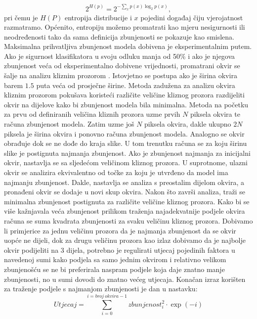 \documentclass[times, utf8, diplomski]{fer}
\theoremstyle{definition}
\begin{document}
\begin{equation}
2^{H(p)} = 2 ^ {- \sum_{x}^{}p(x)\log_{2}p(x)},
\end{equation}
pri čemu je $H(P)$ entropija distribucije i $x$ pojedini događaj čiju vjerojatnost razmatramo. Općenito, entropiju možemo promatrati kao mjeru nesigurnosti ili neodređenosti tako da sama definicija zbunjenosti se pokazuje kao smislena. Maksimalna prihvatljiva zbunjenost modela dobivena je eksperimentalnim putem. Ako je sigurnost klasifikatora u svoju odluku manja od 50\% i ako je njegova zbunjenost veća od eksperimentalno dobivene vrijednosti, promatrani okvir se šalje na analizu kliznim prozorom . Istovjetno se postupa ako je širina okvira barem $1.5$ puta veća od prosječne širine.
\newline
Metoda zadužena za analizu okvira kliznim prozorom pokušava koristeći različite veličine kliznog prozora razdijeliti okvir na dijelove kako bi zbunjenost modela bila minimalna. Metoda na početku za prvu od definiranih veličina kliznih prozora uzme prvih $N$ piksela okvira te računa zbunjenost modela. Zatim uzme još $N$ piksela okvira, dakle ukupno $2N$ piksela je širina okvira i ponovno računa zbunjenost modela. Analogno se okvir obrađuje dok se ne dođe do kraja slike. U tom trenutku računa se za koju širinu slike je postignuta najmanja zbunjenost. Ako je zbunjenost najmanja za inicijalni okvir, nastavlja se sa sljedećom veličinom kliznog prozora. U suprotnome, ulazni okvir se analizira ekvivalentno od točke za koju je utvrđeno da model ima najmanju zbunjenost. Dakle, nastavlja se analiza s preostalim dijelom okvira, a pronađeni okvir se dodaje u novi skup okvira. Nakon što završi analiza, traži se minimalna zbunjenost postignuta za različite veličine kliznog prozora. Kako bi se više kažnjavala veća zbunjenost prilikom traženja najadekvatnije podjele okvira računa se suma kvadrata zbunjenosti za svaku veličinu kliznog prozora. Dobivamo li primjerice za jednu veličinu prozora da je najmanja zbunjenost da se okvir uopće ne dijeli, dok za drugu veličinu prozora kao izlaz dobivamo da je najbolje okvir podijeliti na 3 dijela, potrebno je regulirati utjecaj pojedinih faktora u navedenoj sumi kako podjela sa samo jednim okvirom i relativno velikom zbunjenošću se ne bi preferirala naspram podjele koja daje znatno manje zbunjenosti, no u sumi dovodi do znatno većeg utjecaja. Konačan izraz korišten za traženje podjele s najmanjom zbunjenosti je dan u nastavku:
\begin{equation}
Utjecaj = \sum_{i = 0}^{i = broj\ okvira - 1} zbunjenost_{i}^2 \cdot \exp(-i)
\end{equation}
\end{document}
